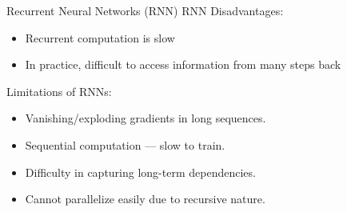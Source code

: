 \begin{frame}[allowframebreaks]{Recurrent Neural Networks (RNN)}
    \large RNN Disadvantages:
        \begin{itemize}
            \item Recurrent computation is slow 
            \item In practice, difficult to access information from many steps back
        \end{itemize}
    \vspace{0.5cm}
    \large Limitations of RNNs:
        \begin{itemize}
            \item Vanishing/exploding gradients in long sequences.
            \item Sequential computation --- slow to train.
            \item Difficulty in capturing long-term dependencies.
            \item Cannot parallelize easily due to recursive nature.
        \end{itemize}
\end{frame}
